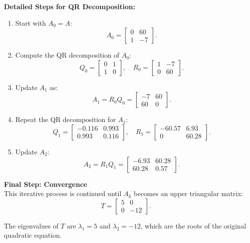 \documentclass[journal]{IEEEtran}
\begin{document}
	\textbf{Detailed Steps for QR Decomposition:}\\
	\begin{enumerate}
		\item Start with \( A_0 = A \):
		\[
		A_0 = \begin{bmatrix}
			0 & 60 \\
			1 & -7
		\end{bmatrix}.
		\]
		\item Compute the QR decomposition of \( A_0 \):
		\[
		Q_0 = \begin{bmatrix}
			0 & 1 \\
			1 & 0
		\end{bmatrix}, \quad
		R_0 = \begin{bmatrix}
			1 & -7 \\
			0 & 60
		\end{bmatrix}.
		\]
		\item Update \( A_1 \) as:
		\[
		A_1 = R_0 Q_0 = \begin{bmatrix}
			-7 & 60 \\
			60 & 0
		\end{bmatrix}.
		\]
		\item Repeat the QR decomposition for \( A_1 \):
		\[
		Q_1 = \begin{bmatrix}
			-0.116 & 0.993 \\
			0.993 & 0.116
		\end{bmatrix}, \quad
		R_1 = \begin{bmatrix}
			-60.57 & 6.93 \\
			0 & 60.28
		\end{bmatrix}.
		\]
		\item Update \( A_2 \):
		\[
		A_2 = R_1 Q_1 = \begin{bmatrix}
			-6.93 & 60.28 \\
			60.28 & 0.57
		\end{bmatrix}.
		\]
	\end{enumerate}
	
	\textbf{Final Step: Convergence}\\
	This iterative process is continued until \( A_k \) becomes an upper triangular matrix:
	\[
	T = \begin{bmatrix}
		5 & 0 \\
		0 & -12
	\end{bmatrix}.
	\]
	
	The eigenvalues of \( T \) are \( \lambda_1 = 5 \) and \( \lambda_2 = -12 \), which are the roots of the original quadratic equation.
	
\end{document}
